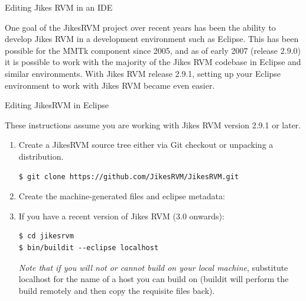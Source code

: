 \begin{section}{Editing Jikes RVM in an IDE}
\label{sec:editingjikesrvminanide}

One goal of the JikesRVM project over recent years has been the ability to develop Jikes RVM in a development environment such as Eclipse. This has been possible for the MMTk component since 2005, and as of early 2007 (release 2.9.0) it is possible to work with the majority of the Jikes RVM codebase in Eclipse and similar environments.  With Jikes RVM release 2.9.1, setting up your Eclipse environment to work with Jikes RVM became even easier.

\begin{subsection}{Editing JikesRVM in Eclipse}

These instructions assume you are working with Jikes RVM version 2.9.1 or later.

\begin{enumerate}
  \item Create a JikesRVM source tree either via Git checkout or unpacking a distribution.
     \begin{lstlisting}
$ git clone https://github.com/JikesRVM/JikesRVM.git
     \end{lstlisting}
  \item Create the machine-generated files and eclipse metadata:
     \item If you have a recent version of Jikes RVM (3.0 onwards):
       \begin{lstlisting}
$ cd jikesrvm
$ bin/buildit --eclipse localhost
       \end{lstlisting}
        \textit{Note that if you will not or cannot build on your local machine}, substitute localhost for the name of a host you can build on (buildit will perform the build remotely and then copy the requisite files back).


\end{enumerate}
\end{subsection}
\end{section}
